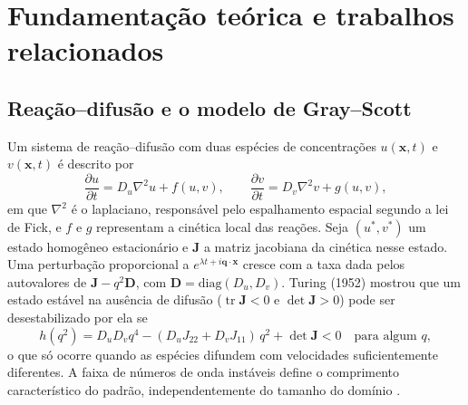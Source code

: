 \documentclass[12pt]{article}
\begin{document}
\section{Fundamentação teórica e trabalhos relacionados}
\label{sec:fundamentacao}

\subsection{Reação--difusão e o modelo de Gray--Scott}
\label{subsec:gray-scott}

Um sistema de reação--difusão com duas espécies de concentrações $u(\mathbf{x},t)$ e $v(\mathbf{x},t)$ é descrito por
\begin{equation}
\frac{\partial u}{\partial t} = D_u \nabla^2 u + f(u,v), \qquad
\frac{\partial v}{\partial t} = D_v \nabla^2 v + g(u,v),
\label{eq:rd}
\end{equation}
em que $\nabla^2$ é o laplaciano, responsável pelo espalhamento espacial segundo a lei de Fick, e $f$ e $g$ representam a cinética local das reações. Seja $(u^*,v^*)$ um estado homogêneo estacionário e $\mathbf{J}$ a matriz jacobiana da cinética nesse estado. Uma perturbação proporcional a $e^{\lambda t+i\mathbf{q}\cdot\mathbf{x}}$ cresce com a taxa dada pelos autovalores de $\mathbf{J}-q^2\mathbf{D}$, com $\mathbf{D}=\mathrm{diag}(D_u,D_v)$. Turing (1952) mostrou que um estado estável na ausência de difusão ($\operatorname{tr}\mathbf{J}<0$ e $\det\mathbf{J}>0$) pode ser desestabilizado por ela se
\begin{equation}
h(q^2)=D_uD_v q^4-(D_u J_{22} + D_v J_{11})\,q^2+\det\mathbf{J} < 0 \quad\text{para algum } q,
\end{equation}
o que só ocorre quando as espécies difundem com velocidades suficientemente diferentes. A faixa de números de onda instáveis define o comprimento característico do padrão, independentemente do tamanho do domínio \cite{murray2003}.
\end{document}
